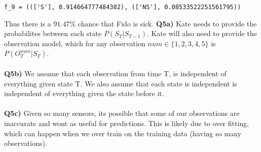 \documentclass{article}
\begin{document}
\begin{titlepage}
\begin{lstlisting}
f_9 = ((['S'], 0.914664777484382), (['NS'], 0.08533522251561795))
\end{lstlisting}
Thus there is a $91.47\%$ chance that Fido is sick.
\newpage
\textbf{Q5a)} Kate needs to provide the probabilites between each state $P(S_T | S_{T-1})$. Kate will also need to provide the observation model, which for any observation $num \in \{1,2,3,4,5\}$ is $P(O^{num}_T | S_T)$.\\\\
\textbf{Q5b)} We assume that each observation from time T, is independent of everything given state T. We also assume that each state is independent is independent of everything given the state before it. \\\\
\textbf{Q5c)} Given so many sensors, its possible that some of our observations are inaccurate and wont as useful for predictions. This is likely due to over fitting, which can happen when we over train on the training data (having so many observations).
\end{titlepage}
\end{document}
